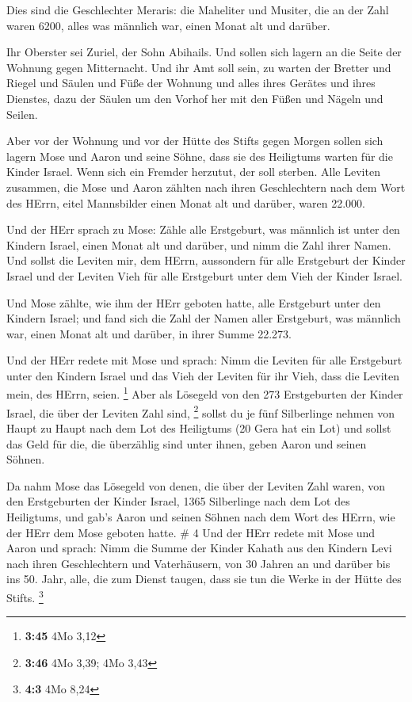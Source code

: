  Dies sind die Geschlechter Meraris: die Maheliter und
Musiter,  die an der Zahl waren 6200, alles was männlich
war, einen Monat alt und darüber.

 Ihr Oberster sei Zuriel, der Sohn Abihails. Und sollen
sich lagern an die Seite der Wohnung gegen Mitternacht. 
Und ihr Amt soll sein, zu warten der Bretter und Riegel und Säulen und
Füße der Wohnung und alles ihres Gerätes und ihres Dienstes,
 dazu der Säulen um den Vorhof her mit den Füßen und Nägeln
und Seilen.

 Aber vor der Wohnung und vor der Hütte des Stifts gegen
Morgen sollen sich lagern Mose und Aaron und seine Söhne, dass sie des
Heiligtums warten für die Kinder Israel. Wenn sich ein Fremder herzutut,
der soll sterben.  Alle Leviten zusammen, die Mose und
Aaron zählten nach ihren Geschlechtern nach dem Wort des HErrn, eitel
Mannsbilder einen Monat alt und darüber, waren 22.000.

 Und der HErr sprach zu Mose: Zähle alle Erstgeburt, was
männlich ist unter den Kindern Israel, einen Monat alt und darüber, und
nimm die Zahl ihrer Namen.  Und sollst die Leviten mir, dem
HErrn, aussondern für alle Erstgeburt der Kinder Israel und der Leviten
Vieh für alle Erstgeburt unter dem Vieh der Kinder Israel.

 Und Mose zählte, wie ihm der HErr geboten hatte, alle
Erstgeburt unter den Kindern Israel;  und fand sich die
Zahl der Namen aller Erstgeburt, was männlich war, einen Monat alt und
darüber, in ihrer Summe 22.273.

 Und der HErr redete mit Mose und sprach: 
Nimm die Leviten für alle Erstgeburt unter den Kindern Israel und das
Vieh der Leviten für ihr Vieh, dass die Leviten mein, des HErrn, seien.
\footnote{\textbf{3:45} 4Mo 3,12}  Aber als Lösegeld von
den 273 Erstgeburten der Kinder Israel, die über der Leviten Zahl sind,
\footnote{\textbf{3:46} 4Mo 3,39; 4Mo 3,43}  sollst du je
fünf Silberlinge nehmen von Haupt zu Haupt nach dem Lot des Heiligtums
(20 Gera hat ein Lot)  und sollst das Geld für die, die
überzählig sind unter ihnen, geben Aaron und seinen Söhnen.

 Da nahm Mose das Lösegeld von denen, die über der Leviten
Zahl waren,  von den Erstgeburten der Kinder Israel, 1365
Silberlinge nach dem Lot des Heiligtums,  und gab's Aaron
und seinen Söhnen nach dem Wort des HErrn, wie der HErr dem Mose geboten
hatte. \# 4  Und der HErr redete mit Mose und Aaron und
sprach:  Nimm die Summe der Kinder Kahath aus den Kindern
Levi nach ihren Geschlechtern und Vaterhäusern,  von 30
Jahren an und darüber bis ins 50. Jahr, alle, die zum Dienst taugen,
dass sie tun die Werke in der Hütte des Stifts. \footnote{\textbf{4:3}
  4Mo 8,24}

